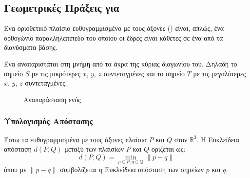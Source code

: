 \subsection{Γεωμετρικές Πράξεις για }
Ένα οριοθετικό πλαίσιο ευθυγραμμισμένο με τους άξονες ()
είναι, απλώς, ένα ορθογώνιο παραλληλεπίπεδο του οποίου οι 
έδρες είναι κάθετες σε ένα από τα διανύσματα βάσης.

Ένα  αναπαριστάται στη μνήμη από τα άκρα της κύριας 
διαγωνίου του.
Δηλαδή το σημείο $S$ με τις μικρότερες $x$, $y$, $z$ συντεταγμένες
και το σημείο $T$ με τις μεγαλύτερες $x$, $y$, $z$ συντεταγμένες.

\begin{figure}[h]
    \centering
    
    \newcommand{\Depth}{2}
    \newcommand{\Height}{2}
    \newcommand{\Width}{3}
    \caption[Αναπαράσταση ενός ]{Αναπαράσταση ενός }
\end{figure}

\subsubsection{Υπολογισμός Απόστασης }
Έστω τα ευθυγραμμισμένα με τους άξονες πλαίσια
$P$ και $Q$ στον $\mathbb{R}^3$.
Η Ευκλείδεια απόσταση $d(P,Q)$ μεταξύ των πλαισίων $P$ και $Q$
ορίζεται ως:
\[ d(P,Q) = \min_{p \in P, q \in Q} \lVert p - q \rVert \]
όπου με $\lVert p - q \rVert$ συμβολίζεται η Ευκλείδεια 
απόσταση των σημείων $p$ και $q$.

